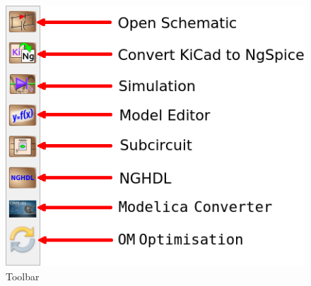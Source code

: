 \begin{figure}[h]
\centering
\includegraphics[width=\lgfig]{manual_images/guitoolbar.PNG}
\caption{Toolbar}
\label{guitoolbar}
\end{figure}

